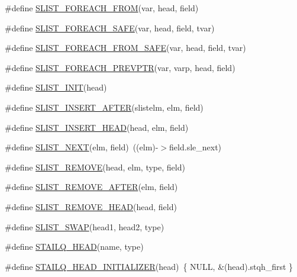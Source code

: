 \begin{DoxyCompactItemize}
\#define \hyperlink{queue_8h_a24405a36fc765b619964d525714c7827}{S\-L\-I\-S\-T\-\_\-\-F\-O\-R\-E\-A\-C\-H\-\_\-\-F\-R\-O\-M}(var, head, field)
\item 
\#define \hyperlink{queue_8h_afeca7f301bcbd06a17821aa00e9d14d5}{S\-L\-I\-S\-T\-\_\-\-F\-O\-R\-E\-A\-C\-H\-\_\-\-S\-A\-F\-E}(var, head, field, tvar)
\item 
\#define \hyperlink{queue_8h_a6eaa913f1fb42af030c7933b5257643f}{S\-L\-I\-S\-T\-\_\-\-F\-O\-R\-E\-A\-C\-H\-\_\-\-F\-R\-O\-M\-\_\-\-S\-A\-F\-E}(var, head, field, tvar)
\item 
\#define \hyperlink{queue_8h_a7017f84f3ba90cd69441f09b2825f7b9}{S\-L\-I\-S\-T\-\_\-\-F\-O\-R\-E\-A\-C\-H\-\_\-\-P\-R\-E\-V\-P\-T\-R}(var, varp, head, field)
\item 
\#define \hyperlink{queue_8h_a361ac8e88cf066cc4d46d28b54fd3031}{S\-L\-I\-S\-T\-\_\-\-I\-N\-I\-T}(head)
\item 
\#define \hyperlink{queue_8h_af1d994d9652ccbc41a60b747dfc15ea5}{S\-L\-I\-S\-T\-\_\-\-I\-N\-S\-E\-R\-T\-\_\-\-A\-F\-T\-E\-R}(slistelm, elm, field)
\item 
\#define \hyperlink{queue_8h_a48df7439e09a419afabdd1f2f8551e73}{S\-L\-I\-S\-T\-\_\-\-I\-N\-S\-E\-R\-T\-\_\-\-H\-E\-A\-D}(head, elm, field)
\item 
\#define \hyperlink{queue_8h_a7cd1d5ae37224ecee1f0b831eb73e7f4}{S\-L\-I\-S\-T\-\_\-\-N\-E\-X\-T}(elm, field)~((elm)-\/$>$field.\-sle\-\_\-next)
\item 
\#define \hyperlink{queue_8h_a9c7950d61593ab9198524fca81b17ab0}{S\-L\-I\-S\-T\-\_\-\-R\-E\-M\-O\-V\-E}(head, elm, type, field)
\item 
\#define \hyperlink{queue_8h_a16cbbc38c258a695356d8c3377a5604d}{S\-L\-I\-S\-T\-\_\-\-R\-E\-M\-O\-V\-E\-\_\-\-A\-F\-T\-E\-R}(elm, field)
\item 
\#define \hyperlink{queue_8h_aeb10c664372b3b680455274170f4c897}{S\-L\-I\-S\-T\-\_\-\-R\-E\-M\-O\-V\-E\-\_\-\-H\-E\-A\-D}(head, field)
\item 
\#define \hyperlink{queue_8h_a43b7433e67885b7f342abe61a7e29745}{S\-L\-I\-S\-T\-\_\-\-S\-W\-A\-P}(head1, head2, type)
\item 
\#define \hyperlink{queue_8h_a7b54f0de61925e7cf33184c2ec24da14}{S\-T\-A\-I\-L\-Q\-\_\-\-H\-E\-A\-D}(name, type)
\item 
\#define \hyperlink{queue_8h_a3d41ce2c3f1dd21c0d4051d13204c321}{S\-T\-A\-I\-L\-Q\-\_\-\-H\-E\-A\-D\-\_\-\-I\-N\-I\-T\-I\-A\-L\-I\-Z\-E\-R}(head)~\{ N\-U\-L\-L, \&(head).stqh\-\_\-first \}
\item 

\end{DoxyCompactItemize}
